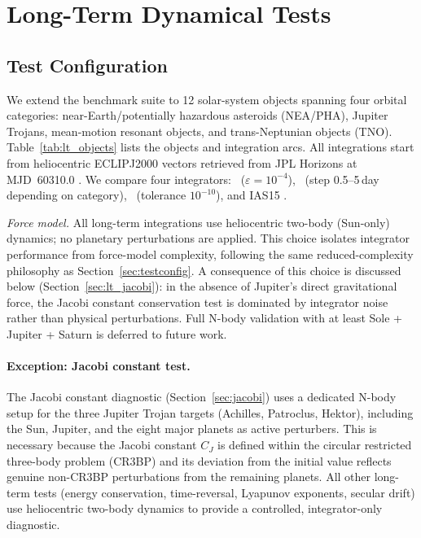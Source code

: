 \section{Long-Term Dynamical Tests}
\label{sec:longterm}

\subsection{Test Configuration}
\label{sec:lt_config}

We extend the benchmark suite to 12 solar-system objects
spanning four orbital categories: near-Earth/potentially
hazardous asteroids (NEA/PHA), Jupiter Trojans, mean-motion
resonant objects, and trans-Neptunian objects (TNO).
Table~\ref{tab:lt_objects} lists the objects and integration
arcs. All integrations start from heliocentric ECLIPJ2000
vectors retrieved from JPL Horizons at MJD~60310.0
\citep{giorgini1996}. We compare four integrators:
\AAS\ ($\varepsilon = 10^{-4}$), \saba\
(step 0.5--5\,day depending on category), \rkf\
(tolerance $10^{-10}$), and IAS15
\citep{ReinSpiegel2015}.

\textit{Force model.}
All long-term integrations use heliocentric two-body
(Sun-only) dynamics; no planetary perturbations are applied.
This choice isolates integrator performance from force-model
complexity, following the same reduced-complexity philosophy
as Section~\ref{sec:testconfig}. A consequence of this choice
is discussed below (Section~\ref{sec:lt_jacobi}): in the
absence of Jupiter's direct gravitational force, the Jacobi
constant conservation test is dominated by integrator noise
rather than physical perturbations.
Full N-body validation with at least Sole + Jupiter + Saturn
is deferred to future work.

\paragraph{Exception: Jacobi constant test.}
The Jacobi constant diagnostic (Section~\ref{sec:jacobi})
uses a dedicated N-body setup for the three Jupiter
Trojan targets (Achilles, Patroclus, Hektor), including
the Sun, Jupiter, and the eight major planets as
active perturbers. This is necessary because the
Jacobi constant $C_J$ is defined within the circular
restricted three-body problem (CR3BP) and its
deviation from the initial value reflects genuine
non-CR3BP perturbations from the remaining planets.
All other long-term tests (energy conservation,
time-reversal, Lyapunov exponents, secular drift)
use heliocentric two-body dynamics to provide a
controlled, integrator-only diagnostic.

